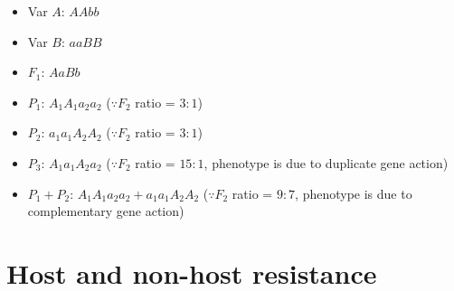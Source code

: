 \documentclass[11pt,dvipsnames,ignorenonframetext,aspectratio=169]{beamer}
\providecommand{\tightlist}{%
  \setlength{\itemsep}{0pt}\setlength{\parskip}{0pt}}
\begin{document}
\begin{frame}{}
\protect\hypertarget{section-10}{}
\begin{itemize}
\tightlist
\item
  Var \(A\): \(AAbb\)
\item
  Var \(B\): \(aaBB\)
\item
  \(F_1\): \(AaBb\)
\item
  \(P_1\): \(A_1 A_1 a_2 a_2\) (\(\because F_2\) ratio = \(3:1\))
\item
  \(P_2\): \(a_1 a_1 A_2 A_2\) (\(\because F_2\) ratio = \(3:1\))
\item
  \(P_3\): \(A_1 a_1 A_2 a_2\) (\(\because F_2\) ratio = \(15:1\),
  phenotype is due to duplicate gene action)
\item
  \(P_1 + P_2\): \(A_1 A_1 a_2 a_2 + a_1 a_1 A_2 A_2\) (\(\because F_2\)
  ratio = \(9:7\), phenotype is due to complementary gene action)
\end{itemize}
\end{frame}

\hypertarget{host-and-non-host-resistance}{%
\section{Host and non-host
resistance}\label{host-and-non-host-resistance}}
\end{document}
